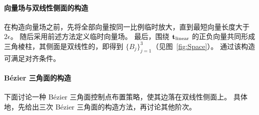 \paragraph{向量场与双线性侧面的构造}
在构造向量场之前，先将全部向量按同一比例临时放大，直到最短向量长度大于 $2\epsilon$。
%
随后采用前述方法定义临时向量场。
%
最后，围绕 $\mathbf{t}_{\text{linear}}$ 的正负向量共同形成三角棱柱，其侧面是双线性的，即得到 $\{B_{j}\}^3_{j=1}$（见图~\ref{fig:Space}）。
%
通过该构造可满足对齐条件。



\paragraph{B\'{e}zier 三角面的构造}
下面讨论一种 B\'{e}zier 三角面控制点布置策略，使其边落在双线性侧面上。
%
具体地，先给出三次 B\'{e}zier 三角面的构造方法，再讨论其他阶次。

